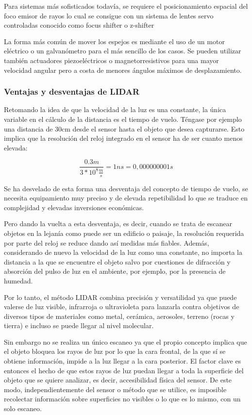 Para sistemas más sofisticados todavía, se requiere el posicionamiento espacial del foco emisor de rayos lo cual se consigue con un sistema de lentes servo controladas conocido como focus shifter o z-shifter

La forma más común de mover los espejos es mediante el uso de un motor eléctrico o un galvanómetro para el más sencillo de los casos. Se pueden utilizar también actuadores piezoeléctricos o magnetorresistivos para una mayor velocidad angular pero a costa de menores ángulos máximos de desplazamiento.

\subsubsection{Ventajas y desventajas de LIDAR}

Retomando la idea de que la velocidad de la luz es una constante, la única variable en el cálculo de la distancia es el tiempo de vuelo. Téngase por ejemplo una distancia de 30cm desde el sensor hasta el objeto que desea capturarse. Esto implica que la resolución del reloj integrado en el sensor ha de ser cuanto menos elevada:

\begin{equation}
\frac{0.3m}{3*10^{8}\frac{m}{s}} = 1ns =0,000000001s
\end{equation}

Se ha desvelado de esta forma una desventaja del concepto de tiempo de vuelo, se necesita equipamiento muy preciso y de elevada repetibilidad lo que se traduce en complejidad y elevadas inversiones económicas.

Pero dando la vuelta a esta desventaja, es decir, cuando se trata de escanear objetos en la lejanía como puede ser un edificio o paisaje, la resolución requerida por parte del reloj se reduce dando así medidas más fiables. Además, considerando de nuevo la velocidad de la luz como una constante, no importa la distancia a la que se encuentre el objeto salvo por cuestiones de difracción y absorción del pulso de luz en el ambiente, por ejemplo, por la presencia de humedad.

Por lo tanto, el método LIDAR combina precisión y versatilidad ya que puede valerse de luz visible, infrarroja o ultravioleta para lanzarla contra objetivos de diversos tipos de materiales como metal, cerámica, aerosoles, terreno (rocas y tierra) e incluso se puede llegar al nivel molecular. 
 
Sin embargo no se realiza un único escaneo ya que el propio concepto implica que el objeto bloquea los rayos de luz por lo que la cara frontal, de la que sí se obtiene información, impide a la luz llegar a la cara posterior. El factor clave es entonces el hecho de que estos rayos de luz puedan llegar a toda la superficie del objeto que se quiere analizar, es decir, accesibilidad física del sensor.
De este modo, independientemente del sensor o método que se utilice, es imposible recolectar
información sobre superficies no visibles o lo que es lo mismo, con un solo escaneo.


